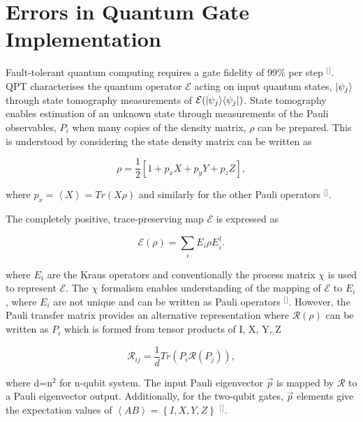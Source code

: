 \section{\label{sec:level1}Errors in Quantum Gate Implementation} Fault-tolerant quantum computing requires a gate fidelity of 99\% per step $^{[}$\citep{Barends2014SuperconductingTolerance}$^{]}$. QPT characterises the quantum operator $\mathcal{E}$ acting on input quantum states, $\lvert\psi_{j}\rangle$ through state tomography measurements of $\mathcal{E}(\lvert\psi_{j}\rangle\langle\psi_{j}\rvert)$. State tomography enables estimation of an unknown state through measurements of the Pauli observables, $P_{i}$ when many copies of the density matrix, $\rho$ can be prepared. This is understood by considering the state density matrix can be written as


\begin{equation}
\label{eq:densitymatrix}
\rho = \frac{1}{2} \left [ 1 + p_{x} X + p_{y}Y + p_{z}Z \right ],
\end{equation}

where $p_{x}=\left \langle X \right \rangle = Tr(X \rho)$ and similarly for the other Pauli operators $^{[}$\citep{Nielsen2010QuantumInformation}$^{]}$. 

The completely positive, trace-preserving map $\mathcal{E}$ is expressed as

\begin{equation}
\label{eq:superquantumoperator}
\mathcal{E} (\rho) = \sum_{i} E_{i} \rho E_{i}^{\dagger}.
\end{equation}

where $E_{i}$ are the Kraus operators and conventionally the process matrix $\chi$ is used to represent $\mathcal{E}$. The $\chi$ formalism enables understanding of the mapping of $\mathcal{E}$ to $E_{i}$, where $E_{i}$ are not unique and can be written as Pauli operators $^{[}$\citep{Mohseni2008Quantum-processStrategies}$^{]}$. However, the Pauli transfer matrix provides an alternative representation where $\mathcal{R} (\rho)$ can be written as $P_{i}$ which is formed from tensor products of {I, X, Y, Z}

\begin{equation}
\label{eq:PTM}
\mathcal{R}_{ij} = \frac{1}{d} Tr(P_{i}\mathcal{R} (P_{j})),
\end{equation}

where d=n$^{2}$ for n-qubit system. The input Pauli eigenvector $\vec{p}$ is mapped by $\mathcal{R}$ to a Pauli eigenvector output. Additionally, for the two-qubit gates, $\vec{p}$ elements give the expectation values of $\left \langle AB \right \rangle = \left \{ I, X, Y, Z \right \}$ $^{[}$\citep{Chow2012UniversalQubits}$^{]}$. 

